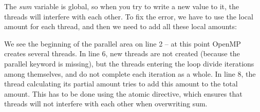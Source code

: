{	\begin{figure}[H]
		
	\end{figure}
	\par The \textit{sum} variable is global, so when you try to write a new value to it, the threads will interfere with each other. To fix the error, we have to use the local amount for each thread, and then we need to add all these local amounts:
	\begin{figure}[H]
		
	\end{figure}
	We see the beginning of the parallel area on line 2 – at this point OpenMP creates several threads. In line 6, new threads are not created (because the parallel keyword is missing), but the threads entering the loop divide iterations among themselves, and do not complete each iteration as a whole. In line 8, the  thread calculating its partial amount tries to add this amount to the total amount. This has to be done using the atomic directive, which ensures that threads will not interfere with each other when overwriting sum.
	
}
